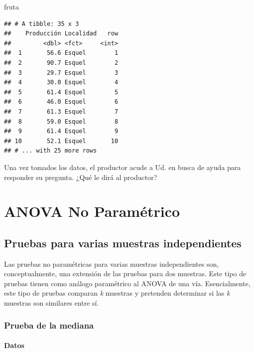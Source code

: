 \documentclass[]{book}
\newenvironment{Shaded}{\begin{snugshade}}{\end{snugshade}}
\newcommand{\NormalTok}[1]{#1}
\theoremstyle{definition}
\theoremstyle{definition}
\theoremstyle{definition}
\theoremstyle{remark}
\begin{document}
\begin{Shaded}
\begin{Highlighting}[]
\NormalTok{fruta}
\end{Highlighting}
\end{Shaded}

\begin{verbatim}
## # A tibble: 35 x 3
##    Producción Localidad   row
##         <dbl> <fct>     <int>
##  1       56.6 Esquel        1
##  2       90.7 Esquel        2
##  3       29.7 Esquel        3
##  4       30.0 Esquel        4
##  5       61.4 Esquel        5
##  6       46.0 Esquel        6
##  7       61.3 Esquel        7
##  8       59.0 Esquel        8
##  9       61.4 Esquel        9
## 10       52.1 Esquel       10
## # ... with 25 more rows
\end{verbatim}

Una vez tomados los datos, el productor acude a Ud. en busca de ayuda
para responder su pregunta. ¿Qué le dirá al productor?

\hypertarget{anova-no-parametrico}{%
\chapter{ANOVA No Paramétrico}\label{anova-no-parametrico}}

\hypertarget{pruebas-para-varias-muestras-independientes}{%
\section{Pruebas para varias muestras
independientes}\label{pruebas-para-varias-muestras-independientes}}

Las pruebas no paramétricas para varias muestras independientes son,
conceptualmente, una extensión de las pruebas para dos muestras. Este
tipo de pruebas tienen como análogo paramétrico al ANOVA de una vía.
Esencialmente, este tipo de pruebas comparan \emph{k} muestras y
pretenden determinar si las \emph{k} muestras son similares entre sí.

\hypertarget{prueba-de-la-mediana}{%
\subsection{Prueba de la mediana}\label{prueba-de-la-mediana}}

\hypertarget{datos-1}{%
\subsubsection{Datos}\label{datos-1}}
\end{document}
